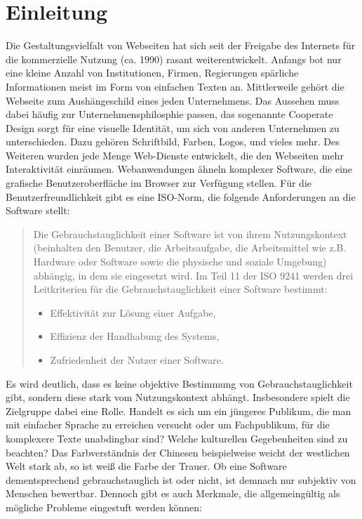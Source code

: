 \documentclass[runningheads,a4paper]{llncs}
\begin{document}
\newpage

\section{Einleitung}
Die Gestaltungsvielfalt von Webseiten hat sich seit der Freigabe des Internets für die kommerzielle Nutzung (ca. 1990) rasant weiterentwickelt. 
Anfangs bot nur eine kleine Anzahl von Institutionen, Firmen, Regierungen spärliche Informationen meist im Form von einfachen Texten an. 
Mittlerweile gehört die Webseite zum Aushängeschild eines jeden Unternehmens. 
Das Aussehen muss dabei häufig zur Unternehmensphilosphie passen, das sogenannte Cooperate Design sorgt für eine visuelle Identität, um sich von anderen Unternehmen zu unterschieden. 
Dazu gehören Schriftbild, Farben, Logos, und vieles mehr.
Des Weiteren wurden jede Menge Web-Dienste entwickelt, die den Webseiten mehr Interaktivität einräumen. 
Webanwendungen ähneln komplexer Software, die eine grafische Benutzeroberfläche im Browser zur Verfügung stellen.
Für die Benutzerfreundlichkeit gibt es eine ISO-Norm, die folgende Anforderungen an die Software stellt:

\begin{quote}
Die Gebrauchstauglichkeit einer Software ist von ihrem Nutzungskontext (beinhalten den Benutzer, die Arbeitsaufgabe, die Arbeitsmittel wie z.B. Hardware oder Software sowie die physische und soziale Umgebung) abhängig, in dem sie eingesetzt wird. 
Im Teil 11 der ISO 9241 werden drei Leitkriterien für die Gebrauchstauglichkeit einer Software bestimmt:
\begin{itemize}
\item{Effektivität zur Lösung einer Aufgabe,}
\item{Effizienz der Handhabung des Systems,}
\item{Zufriedenheit der Nutzer einer Software.}
\end{itemize}


\end{quote}

Es wird deutlich, dass es keine objektive Bestimmung von Gebrauchstauglichkeit gibt, sondern diese stark vom Nutzungskontext abhängt. 
Insbesondere spielt die Zielgruppe dabei eine Rolle. 
Handelt es sich um ein jüngeres Publikum, die man mit einfacher Sprache zu erreichen versucht oder um Fachpublikum, für die komplexere Texte unabdingbar sind?
Welche kulturellen Gegebenheiten sind zu beachten? 
Das Farbverständnis der Chinesen beispielweise weicht der westlichen Welt stark ab, so ist weiß die Farbe der Trauer.
Ob eine Software dementsprechend gebrauchstauglich ist oder nicht, ist demnach nur subjektiv von Menschen bewertbar.
Dennoch gibt es auch Merkmale, die allgemeingültig als mögliche Probleme eingestuft werden können:
\end{document}
